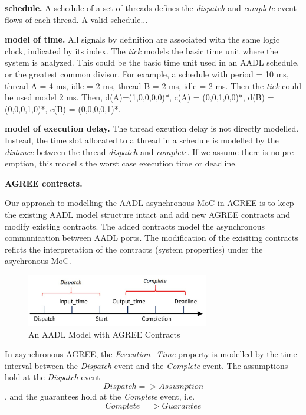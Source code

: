 {\bf schedule.}
A schedule of a set of threads defines the \emph{dispatch} and \emph{complete} event flows of each thread. A valid schedule...

{\bf model of time.}
All signals by definition are associated with the same logic clock, indicated by its index. The \emph{tick} models the basic time unit where the system is analyzed. This could be the basic time unit used in an AADL schedule, or the greatest common divisor. For example, a schedule with period = 10 ms, thread A = 4 ms, idle = 2 ms, thread B = 2 ms,  idle = 2 ms. Then the \emph{tick} could be used model 2 ms. Then, d(A)=(1,0,0,0,0)*, c(A) = (0,0,1,0,0)*, d(B) = (0,0,0,1,0)*, c(B) = (0,0,0,0,1)*.

{\bf model of execution delay.}
The thread exeution delay is not directly modelled. Instead, the time slot allocated to a thread in a schedule is modelled by the \emph{distance} between the thread \emph{dispatch} and \emph{complete}. If we assume there is no pre-emption, this modells  the worst case execution time or deadline.


{\bf AGREE contracts.}

Our approach to modelling the AADL asynchronous MoC in AGREE is to keep the existing AADL model structure intact and add new AGREE contracts and modify existing contracts. The added contracts model the asynchronous communication between AADL ports. The modification of the exisiting contracts reflcts the interpretation of the contracts (system properties) under the asychronous MoC. 


\begin{figure}[ht!]
\centering
\includegraphics[width=80mm]{aadl_events.jpg}
\caption{An AADL Model with AGREE Contracts\label{motivation}}
\end{figure}

In asynchronous AGREE, the \emph{Execution\_Time} property is modelled by the time interval between the \emph{Dispatch} event and the \emph{Complete} event.
The assumptions hold at the \emph{Dispatch} event \[Dispatch => Assumption\] , and the guarantees hold at the \emph{Complete} event, i.e. \[Complete => Guarantee\] 

